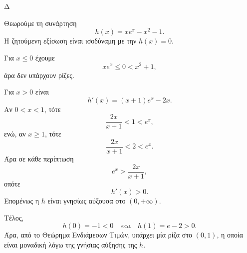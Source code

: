 \begin{thema}{Δ}
\begin{erwthma}
\item Θεωρούμε τη συνάρτηση
\[
h(x)=xe^x-x^2-1.
\]
Η ζητούμενη εξίσωση είναι ισοδύναμη με την $h(x)=0$.

Για $x\leq0$ έχουμε
\[
xe^x\leq0<x^2+1,
\]
άρα δεν υπάρχουν ρίζες.

Για $x>0$ είναι
\[
h'(x)=(x+1)e^x-2x.
\]
Αν $0<x<1$, τότε
\[
\frac{2x}{x+1}<1<e^x,
\]
ενώ, αν $x\geq1$, τότε
\[
\frac{2x}{x+1}<2<e^x.
\]
Άρα σε κάθε περίπτωση
\[
e^x>\frac{2x}{x+1},
\]
οπότε
\[
h'(x)>0.
\]
Επομένως η $h$ είναι γνησίως αύξουσα στο $(0,+\infty)$.

Τέλος,
\[
h(0)=-1<0
\quad\text{και}\quad
h(1)=e-2>0.
\]
Άρα, από το Θεώρημα Ενδιάμεσων Τιμών, υπάρχει μία ρίζα στο $(0,1)$, η οποία είναι μοναδική λόγω της γνήσιας αύξησης της $h$.
\end{erwthma}
\end{thema}

